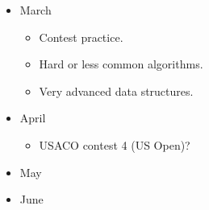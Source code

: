 \documentclass[11pt, oneside]{article}   	%
\begin{document}
\begin{itemize}
\item March
\begin{itemize}
\item Contest practice.
\item Hard or less common algorithms.
\item Very advanced data structures.
\end{itemize}

\item April
\begin{itemize}
\item USACO contest 4 (US Open)?
\end{itemize}

\item May

\item June

\end{itemize}
\end{document}
